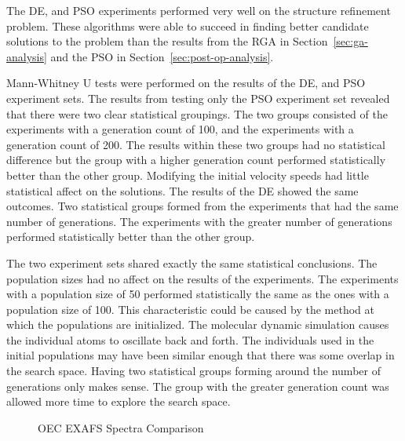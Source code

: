 
The DE, and PSO experiments performed very well on the structure refinement problem. These algorithms were able to succeed in finding better candidate solutions to the problem than the results from the RGA in Section~\ref{sec:ga-analysis} and the PSO in Section~\ref{sec:post-op-analysis}.

Mann-Whitney U tests were performed on the results of the DE, and PSO experiment sets. The results from testing only the PSO experiment set revealed that there were two clear statistical groupings. The two groups consisted of the experiments with a generation count of 100, and the experiments with a generation count of 200. The results within these two groups had no statistical difference but the group with a higher generation count performed statistically better than the other group. Modifying the initial velocity speeds had little statistical affect on the solutions. The results of the DE showed the same outcomes. Two statistical groups formed from the experiments that had the same number of generations. The experiments with the greater number of generations performed statistically better than the other group.

The two experiment sets shared exactly the same statistical conclusions. The population sizes had no affect on the results of the experiments. The experiments with a population size of 50 performed statistically the same as the ones with a population size of 100. This characteristic could be caused by the method at which the populations are initialized. The molecular dynamic simulation causes the individual atoms to oscillate back and forth. The individuals used in the initial populations may have been similar enough that there was some overlap in the search space. Having two statistical groups forming around the number of generations only makes sense. The group with the greater generation count was allowed more time to explore the search space.




\begin{figure*}
	\centering
	\caption{OEC EXAFS Spectra Comparison}
	\label{fig:bestRunEXAFS}
\end{figure*}